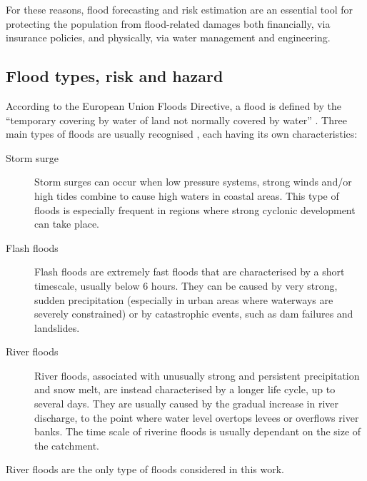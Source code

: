 For these reasons, flood forecasting and risk estimation are an essential tool for protecting the population from flood-related damages both financially, via insurance policies, and physically, via water management and engineering.

\subsection{Flood types, risk and hazard}
According to the European Union Floods Directive, a flood is defined by the \enquote{temporary covering by water of land not normally covered by water} \citep{EUFD2007}.
Three main types of floods are usually recognised \citep[see][]{Kron2005}, each having its own characteristics:
\begin{description}
    \item[Storm surge] Storm surges can occur when low pressure systems, strong winds and/or high tides combine to cause high waters in coastal areas. This type of floods is especially frequent in regions where strong cyclonic development can take place.
    \item[Flash floods] Flash floods are extremely fast floods that are characterised by a short timescale, usually below 6 hours. They can be caused by very strong, sudden precipitation (especially in urban areas where waterways are severely constrained) or by catastrophic events, such as dam failures and landslides.
    \item[River floods] River floods, associated with unusually strong and persistent precipitation and snow melt, are instead characterised by a longer life cycle, up to several days. They are usually caused by the gradual increase in river discharge, to the point where water level overtops levees or overflows river banks. The time scale of riverine floods is usually dependant on the size of the catchment.
\end{description}
River floods are the only type of floods considered in this work.


